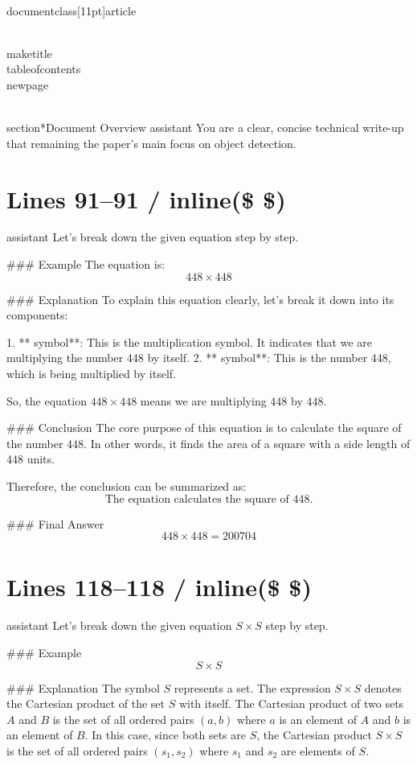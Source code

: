 \\documentclass[11pt]{article}
\begin{document}
\\maketitle
\\tableofcontents
\\newpage

\\section*{Document Overview}
assistant
You are a clear, concise technical write-up that remaining the paper's main focus on object detection.

\newpage

\section*{Lines 91–91 / inline(\$ \$) }
assistant
Let's break down the given equation step by step.

### Example
The equation is:
\[ 448 \times 448 \]

### Explanation
To explain this equation clearly, let's break it down into its components:

1. ** symbol**: This is the multiplication symbol. It indicates that we are multiplying the number 448 by itself.
2. ** symbol**: This is the number 448, which is being multiplied by itself.

So, the equation \( 448 \times 448 \) means we are multiplying 448 by 448.

### Conclusion
The core purpose of this equation is to calculate the square of the number 448. In other words, it finds the area of a square with a side length of 448 units.

Therefore, the conclusion can be summarized as:
\[ \text{The equation calculates the square of 448.} \]

### Final Answer
\[
\boxed{448 \times 448 = 200704}
\]

\section*{Lines 118–118 / inline(\$ \$) }
assistant
Let's break down the given equation \( S \times S \) step by step.

### Example
\[ S \times S \]

### Explanation
The symbol \( S \) represents a set. The expression \( S \times S \) denotes the Cartesian product of the set \( S \) with itself. The Cartesian product of two sets \( A \) and \( B \) is the set of all ordered pairs \((a, b)\) where \( a \) is an element of \( A \) and \( b \) is an element of \( B \). In this case, since both sets are \( S \), the Cartesian product \( S \times S \) is the set of all ordered pairs \((s_1, s_2)\) where \( s_1 \) and \( s_2 \) are elements of \( S \).
\end{document}
